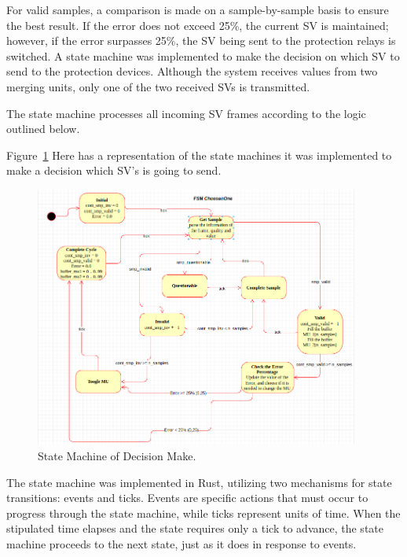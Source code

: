	For valid samples, a comparison is made on a sample-by-sample basis to ensure the best result. If the error does not exceed 25\%, the current SV is maintained; however, if the error surpasses 25\%, the SV being sent to the protection relays is switched. A state machine was implemented to make the decision on which SV to send to the protection devices. Although the system receives values from two merging units, only one of the two received SVs is transmitted.
	
	The state machine processes all incoming SV frames according to the logic outlined below.
	
	Figure~\ref{fig:state_machine} Here has a representation of the state machines it was implemented to make a decision which SV's is going to send.
	
	\begin{figure}[tbh]
		\centering
		\includegraphics[width=0.95\textwidth, keepaspectratio]{ch5/assets/state_machine.png} %
		\caption{State Machine of Decision Make.}
		\label{fig:state_machine}
	\end{figure}
	\FloatBarrier
	
	The state machine was implemented in Rust, utilizing two mechanisms for state transitions: events and ticks. Events are specific actions that must occur to progress through the state machine, while ticks represent units of time. When the stipulated time elapses and the state requires only a tick to advance, the state machine proceeds to the next state, just as it does in response to events.
	
